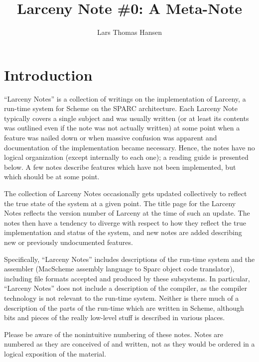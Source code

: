 

\title{Larceny Note \#0: A Meta-Note}
\author{Lars Thomas Hansen}


\maketitle

\section{Introduction}

``Larceny Notes'' is a collection of writings on the implementation of
Larceny, a run-time system for Scheme on the SPARC architecture. Each
Larceny Note typically covers a single subject and was usually written (or
at least its contents was outlined even if the note was not actually
written) at some point when a feature was nailed down or when massive
confusion was apparent and documentation of the implementation became
necessary. Hence, the notes have no logical organization (except internally
to each one); a reading guide is presented below. A few notes describe
features which have not been implemented, but which should be at some point.

The collection of Larceny Notes occasionally gets updated collectively to
reflect the true state of the system at a given point. The title page
for the Larceny Notes reflects the version number of Larceny at the time
of such an update. The notes then have a tendency to diverge with respect
to how they reflect the true implementation and status of the system, and
new notes are added describing new  or previously undocumented features.

Specifically, ``Larceny Notes'' includes descriptions of the run-time system
and the assembler (MacScheme assembly language to Sparc object code
translator), including file formats accepted and produced by these
subsystems.  In particular, ``Larceny Notes'' does not include a description
of the compiler, as the compiler technology is not relevant to the run-time
system.  Neither is there much of a description of the parts of the run-time
which are written in Scheme, although bits and pieces of the really low-level
stuff is described in various places.

Please be aware of the nonintuitive numbering of these notes. Notes
are numbered as they are conceived of and written, not as they would
be ordered in a logical exposition of the material.


